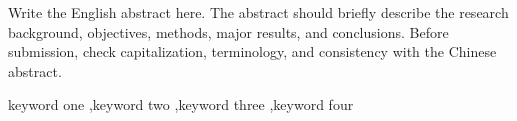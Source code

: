 \jnabstract[en]   %
Write the English abstract here. The abstract should briefly describe the research background, objectives, methods, major results, and conclusions. Before submission, check capitalization, terminology, and consistency with the Chinese abstract.


\begin{jnkeywords}[en]
keyword one \sep keyword two \sep keyword three \sep keyword four

\end{jnkeywords}
